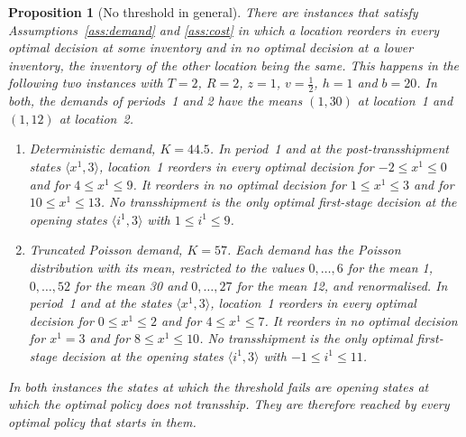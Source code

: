 \documentclass[11pt]{article}
\newtheorem{proposition}{Proposition}
\theoremstyle{definition}
\begin{document}
\begin{proposition}[No threshold in general]\label{prop:threshold}
There are instances that satisfy Assumptions~\ref{ass:demand} and \ref{ass:cost} in which a location reorders in every optimal decision at some inventory and in no optimal decision at a lower inventory, the inventory of the other location being the same. This happens in the following two instances with $T=2$, $R=2$, $z=1$, $v=\tfrac12$, $h=1$ and $b=20$. In both, the demands of periods~1 and 2 have the means $(1,30)$ at location~1 and $(1,12)$ at location~2.
\begin{enumerate}[label=(\alph*)]
\item \emph{Deterministic demand, $K=44.5$.} In period~1 and at the post-transshipment states $\langle x^1,3\rangle$, location~1 reorders in every optimal decision for $-2\le x^1\le0$ and for $4\le x^1\le9$. It reorders in no optimal decision for $1\le x^1\le3$ and for $10\le x^1\le13$. No transshipment is the only optimal first-stage decision at the opening states $\langle i^1,3\rangle$ with $1\le i^1\le9$.
\item \emph{Truncated Poisson demand, $K=57$.} Each demand has the Poisson distribution with its mean, restricted to the values $0,\ldots,6$ for the mean 1, $0,\ldots,52$ for the mean 30 and $0,\ldots,27$ for the mean 12, and renormalised. In period~1 and at the states $\langle x^1,3\rangle$, location~1 reorders in every optimal decision for $0\le x^1\le2$ and for $4\le x^1\le7$. It reorders in no optimal decision for $x^1=3$ and for $8\le x^1\le10$. No transshipment is the only optimal first-stage decision at the opening states $\langle i^1,3\rangle$ with $-1\le i^1\le11$.
\end{enumerate}
In both instances the states at which the threshold fails are opening states at which the optimal policy does not transship. They are therefore reached by every optimal policy that starts in them.
\end{proposition}
\end{document}
